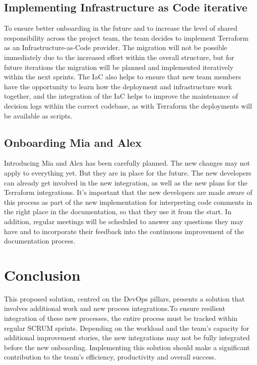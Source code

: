 \subsection{Implementing Infrastructure as Code iterative}
To ensure better onboarding in the future and to increase the level of shared responsibility across the project team, the team decides to implement Terraform as an Infrastructure-as-Code provider. The migration will not be possible immediately due to the increased effort within the overall structure, but for future iterations the migration will be planned and implemented iteratively within the next sprints. The IaC also helps to ensure that new team members have the opportunity to learn how the deployment and infrastructure work together, and the integration of the IaC helps to improve the maintenance of decision logs within the correct codebase, as with Terraform the deployments will be available as scripts.

\subsection{Onboarding Mia and Alex}
Introducing Mia and Alex has been carefully planned. The new changes may not apply to everything yet. But they are in place for the future. The new developers can already get involved in the new integration, as well as the new plans for the Terraform integrations. It's important that the new developers are made aware of this process as part of the new implementation for interpreting code comments in the right place in the documentation, so that they use it from the start. In addition, regular meetings will be scheduled to answer any questions they may have and to incorporate their feedback into the continuous improvement of the documentation process.

\section{Conclusion}
This proposed solution, centred on the DevOps pillars, presents a solution that involves additional work and new process integrations.To ensure resilient integration of these new processes, the entire process must be tracked within regular SCRUM sprints. Depending on the workload and the team's capacity for additional improvement stories, the new integrations may not be fully integrated before the new onboarding. Implementing this solution should make a significant contribution to the team's efficiency, productivity and overall success.

